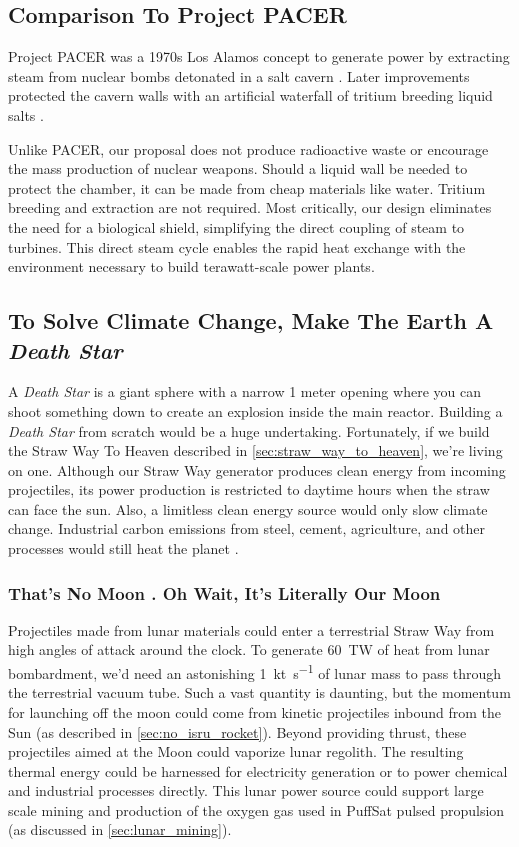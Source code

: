 \documentclass{article}
\begin{document}
\subsection{Comparison To Project PACER}
Project PACER was a 1970s Los Alamos concept to generate power by extracting steam from nuclear bombs detonated in a salt cavern \cite{pacer_1975}.   Later improvements protected the cavern walls with an artificial waterfall of tritium breeding liquid salts \cite{pacer_revisited}.  

Unlike PACER, our proposal does not produce radioactive waste or encourage the mass production of nuclear weapons.   Should a liquid wall be needed to protect the chamber, it can be made from cheap materials like water.  Tritium breeding and extraction are not required.   Most critically, our design eliminates the need for a biological shield, simplifying the direct coupling of steam to turbines. This direct steam cycle enables the rapid heat exchange with the environment necessary to build terawatt-scale power plants.

\subsection{To Solve Climate Change, Make The Earth A \textit{Death Star}}\label{sec:death_star}
A \textit{Death Star} \cite{death_star} is a giant sphere with a  narrow 1 meter opening where you can shoot something down to create an explosion inside the main reactor.   Building a \textit{Death Star} from scratch  would be a huge undertaking.   Fortunately, if we build the Straw Way To Heaven described in \autoref{sec:straw_way_to_heaven}, we're living on one.  Although our Straw Way generator produces clean energy from incoming projectiles, its power production is restricted to daytime hours when the straw can face the sun.   Also, a limitless clean energy source would only slow climate change.   Industrial carbon emissions from steel, cement, agriculture, and other processes would still heat the planet \cite{steel_and_cement}.   

\subsubsection{That's No Moon \cite{kenobi1977moon}.  Oh Wait, It's Literally Our Moon}
Projectiles made from lunar materials could enter a terrestrial Straw Way from high angles of attack around the clock.  To generate \SI{60}{\tera\watt} of heat from lunar bombardment, we'd need an astonishing \SI{1}{\kilo\tonne\per\second} of lunar mass to pass through the terrestrial vacuum tube. Such a vast quantity is daunting, but the momentum for launching off the moon could come from kinetic projectiles inbound from the Sun (as described in \autoref{sec:no_isru_rocket}). Beyond providing thrust, these projectiles aimed at the Moon could vaporize lunar regolith. The resulting thermal energy could be harnessed for electricity generation or to power chemical and industrial processes directly. This lunar power source could support large scale mining and production of the oxygen gas used in PuffSat pulsed propulsion  (as discussed in \autoref{sec:lunar_mining}).
\end{document}
